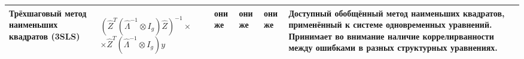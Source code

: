\documentclass[10pt,a4paper]{article}
\begin{document}
\begin{table}
\begin{tabular} {|p{3cm}|p{4cm}|p{2cm}|p{2cm}|p{4cm}|p{10cm}|}
\hline
Трёхшаговый метод наименьших квадратов (3SLS) & \begin{center} $ (\hat Z^T(\hat \Lambda^{-1} \otimes I_g) \hat Z)^{-1} \times$
\newline $\times \hat Z^T (\hat \Lambda^{-1} \otimes I_g)y $ \end{center}& они же & они же & они же & Доступный обобщённый метод наименьших квадратов, применённый к системе одновременных уравнений. Принимает во внимание наличие коррелирванности между ошибками в разных структурных уравнениях. \\
\hline
\end{tabular}
\end{table}
\end{document}
